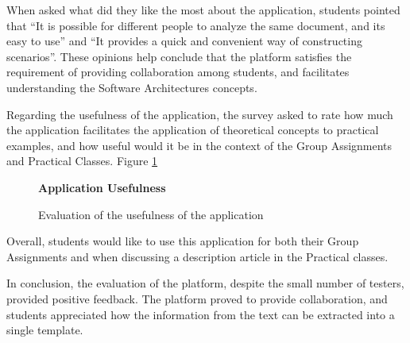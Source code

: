 When asked what did they like the most about the application, students pointed that ``It is possible for different people to analyze the same document, and its easy to use'' and ``It provides a quick and convenient way of constructing scenarios''. These opinions help conclude that the platform satisfies the requirement of providing collaboration among students, and facilitates understanding the Software Architectures concepts.

Regarding the usefulness of the application, the survey asked to rate how much the application facilitates the application of theoretical concepts to practical examples, and how useful would it be in the context of the Group Assignments and Practical Classes. Figure \ref{figure:usefulnessEvaluation}

\begin{figure}[h]
\centering
\begin{normalsize}
\textbf{Application Usefulness}\\
\end{normalsize}
\scriptsize
{}
\caption{Evaluation of the usefulness of the application}
\label{figure:usefulnessEvaluation}
\end{figure}

Overall, students would like to use this application for both their Group Assignments and when discussing a description article in the Practical classes. 

In conclusion, the evaluation of the platform, despite the small number of testers, provided positive feedback. The platform proved to provide collaboration, and students appreciated how the information from the text can be extracted into a single template. 
